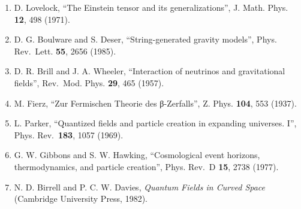 \documentclass[
  10pt,
]{article}
\providecommand{\tightlist}{%
  \setlength{\itemsep}{0pt}\setlength{\parskip}{0pt}}
\begin{document}
\begin{enumerate}
\def\labelenumi{\arabic{enumi}.}
\tightlist
\item
  D. Lovelock, ``The Einstein tensor and its generalizations'', J. Math.
  Phys. \textbf{12}, 498 (1971).
\item
  D. G. Boulware and S. Deser, ``String-generated gravity models'',
  Phys. Rev.~Lett. \textbf{55}, 2656 (1985).
\item
  D. R. Brill and J. A. Wheeler, ``Interaction of neutrinos and
  gravitational fields'', Rev.~Mod. Phys. \textbf{29}, 465 (1957).
\item
  M. Fierz, ``Zur Fermischen Theorie des β-Zerfalls'', Z. Phys.
  \textbf{104}, 553 (1937).
\item
  L. Parker, ``Quantized fields and particle creation in expanding
  universes. I'', Phys. Rev.~\textbf{183}, 1057 (1969).
\item
  G. W. Gibbons and S. W. Hawking, ``Cosmological event horizons,
  thermodynamics, and particle creation'', Phys. Rev.~D \textbf{15},
  2738 (1977).
\item
  N. D. Birrell and P. C. W. Davies, \emph{Quantum Fields in Curved
  Space} (Cambridge University Press, 1982).
\end{enumerate}
\end{document}
